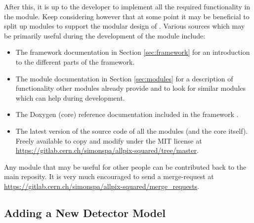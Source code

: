 After this, it is up to the developer to implement all the required functionality in the module. Keep considering however that at some point it may be beneficial to split up modules to support the modular design of \apsq. Various sources which may be primarily useful during the development of the module include:
\begin{itemize}
\item The framework documentation in Section \ref{sec:framework} for an introduction to the different parts of the framework.
\item The module documentation in Section \ref{sec:modules} for a description of functionality other modules already provide and to look for similar modules which can help during development.
\item The Doxygen (core) reference documentation included in the framework .
\item The latest version of the source code of all the modules (and the core itself). Freely available to copy and modify under the MIT license at \url{https://gitlab.cern.ch/simonspa/allpix-squared/tree/master}.
\end{itemize}

Any module that may be useful for other people can be contributed back to the main reposity. It is very much encouraged to send a merge-request at \url{https://gitlab.cern.ch/simonspa/allpix-squared/merge_requests}.

\subsection{Adding a New Detector Model}
\label{sec:adding_detector_model}
\wip
{}
